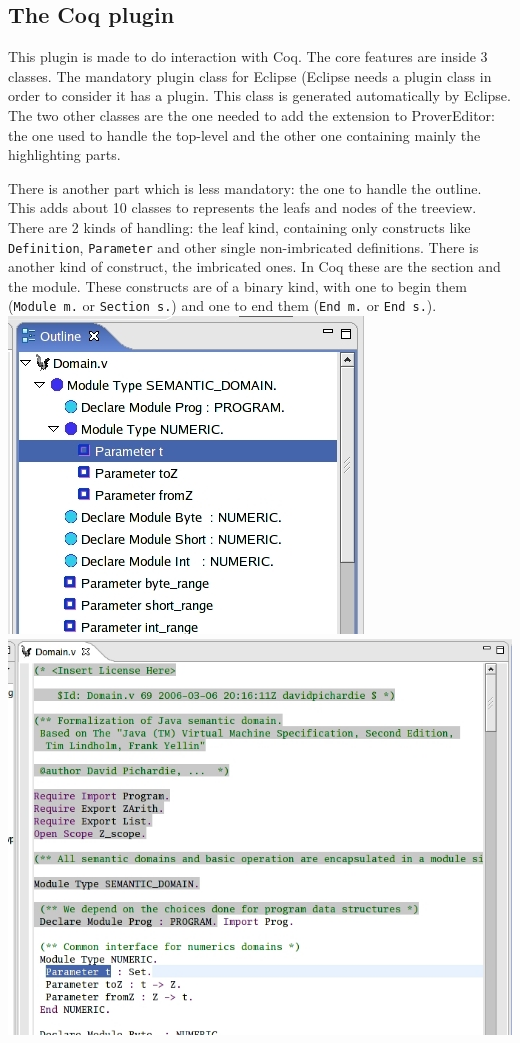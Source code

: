 \documentclass{entcs}
\begin{document}
\subsection{The Coq plugin}
This plugin is made to do interaction with Coq. The core features
are inside 3 classes. The mandatory plugin class for Eclipse (Eclipse
needs a plugin class in order to consider it has a plugin. This class
is generated automatically by Eclipse. The two other classes are the one
needed to add the extension to ProverEditor: the one used to handle the
top-level and the other one containing mainly the highlighting parts.

There is another part which is less mandatory: the one to handle the outline.
This adds about 10 classes to represents the leafs and nodes of the treeview.
There are 2 kinds of handling: the leaf kind, containing only constructs
like {\tt Definition}, {\tt Parameter} and other single non-imbricated
definitions. There is another kind of construct, the imbricated ones.
In Coq these are the section and the module. These constructs are of
a binary kind, with one to begin them ({\tt Module m.} or {\tt Section s.})
and one to end them ({\tt End m.} or {\tt End s.}).\\
\includegraphics[width=0.5\linewidth]{coqoutline}\\
\includegraphics[width=0.6\linewidth]{coqeditor}
\end{document}
